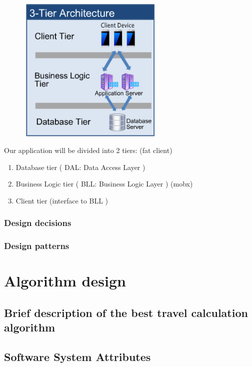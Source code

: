 \documentclass [12pt]{article}
\begin{document}
\begin{figure}[ht!]
\centering
\includegraphics[height=7cm, width=7cm]{3tier.jpg}
\end{figure}  
Our application will be divided into 2 tiers: (fat client)
\begin{enumerate}
\item Database tier ( DAL: Data Access Layer )
\item Business Logic tier ( BLL: Business Logic Layer ) (mobx)
\item Client tier (interface to BLL )
\end{enumerate}


\subsubsection{Design decisions}

\subsubsection{Design patterns}

\section{Algorithm design}

\subsection{Brief description of the best travel calculation algorithm}

\subsection{Software System Attributes} 
\end{document}
